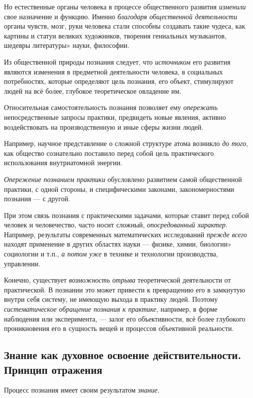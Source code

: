 \documentclass[a4paper,14pt,russian]{extreport}
\begin{document}
Но естественные органы человека в процессе общественного развития \emph{изменили} свое назначение и функцию. Именно \emph{благодаря общественной деятельности} органы чувств, мозг, руки человека стали способны создавать такие чудеса, как картины и статуи великих художников, творения гениальных музыкантов, шедевры литературы» науки, философии.

Из общественной природы познания следует, что \emph{источником} его развития являются изменения в предметной деятельности человека, в социальных потребностях, которые определяют цель познания, его объект, стимулируют людей на всё более, глубокое теоретическое овладение им.

Относительная самостоятельность познания позволяет ему \emph{опережать} непосредственные запросы практики, предвидеть новые явления, активно воздействовать на производственную и иные сферы жизни людей.

Например, научное представление о сложной структуре атома возникло \emph{до того}, как общество сознательно поставило перед собой цель практического использования внутриатомной энергии.

\emph{Опережение познанием практики} обусловлено развитием самой общественной практики, с одной стороны, и специфическими законами, закономерностями познания --- с другой.

При этом связь познания с практическими задачами, которые ставит перед собой человек и человечество, часто носит сложный, \emph{опосредованный характер}. Например, результаты современных математических исследований \emph{прежде всего} находят применение в других областях науки --- физике, химии, биологии» социологии и т.п., \emph{а потом уже} в технике и технологии производства, управлении.

Конечно, существует \emph{возможность отрыва} теоретической деятельности от практической. В познании это может привести к превращению его в замкнутую внутри себя систему, не имеющую выхода в практику людей. Поэтому \emph{систематическое обращение познания к практике}, например, в форме наблюдения или эксперимента, --- залог его объективности, всё более глубокого проникновения его в сущность вещей и процессов объективной реальности.

\subsection{Знание как духовное освоение действительности. Принцип отражения}

Процесс познания имеет своим результатом \emph{знание}.
\end{document}
